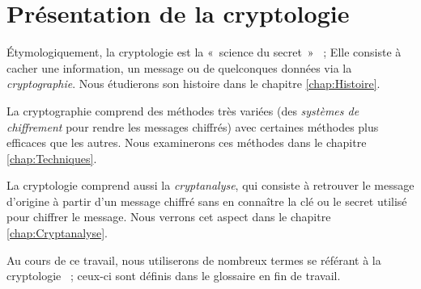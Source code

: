 \section{Présentation de la cryptologie}
Étymologiquement, la cryptologie est la «~science du secret~» ~;
Elle consiste à cacher une
information, un message ou de quelconques données via la
\emph{cryptographie}. Nous étudierons son histoire
dans le chapitre \ref{chap:Histoire}.

La cryptographie comprend des méthodes très variées (des
\emph{systèmes de chiffrement} pour rendre les messages chiffrés)
avec certaines méthodes plus efficaces que les autres.
Nous examinerons ces méthodes dans le chapitre
\ref{chap:Techniques}.

La cryptologie comprend aussi la \emph{cryptanalyse}, qui consiste à
retrouver le message d'origine à partir d'un message chiffré sans en
connaître la clé ou le secret utilisé pour chiffrer le message.
Nous verrons cet aspect dans le chapitre \ref{chap:Cryptanalyse}.

Au cours de ce travail, nous utiliserons de nombreux termes se référant à
la cryptologie ~; ceux-ci sont définis dans le glossaire en fin de travail.
